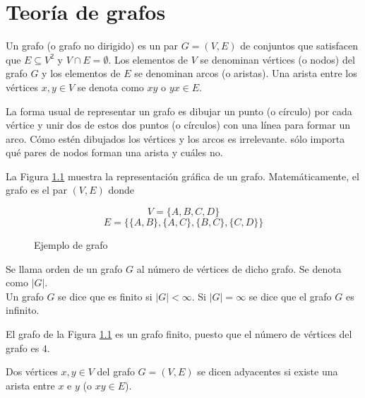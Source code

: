 \chapter{Teoría de grafos} \label{teoria_grafos}

\begin{defi}
Un grafo (o grafo no dirigido) es un par $G = (V,E)$ de conjuntos que satisfacen que $E \subseteq V^2$ y $V \cap E = \emptyset$. Los elementos de $V$ se denominan vértices (o nodos) del grafo $G$ y los elementos de $E$ se denominan arcos (o aristas). Una arista entre los vértices $x, y \in V$ se denota como $xy$ o $yx \in E$.
\end{defi}

La forma usual de representar un grafo es dibujar un punto (o círculo) por cada vértice y unir dos de estos dos puntos (o círculos) con una línea para formar un arco. Cómo estén dibujados los vértices y los arcos es irrelevante. sólo importa qué pares de nodos forman una arista y cuáles no.

\begin{ejemplo}

La Figura \ref{fig:grafo} muestra la representación gráfica de un grafo. Matemáticamente, el grafo es el par $(V, E)$ donde

\[ V = \{A, B, C, D\} \]
\[ E = \{\{A,B\},\{A,C\},\{B,C\},\{C,D\} \} \]

\begin{figure}[htb]
\centering
\ejemplografo
\caption{Ejemplo de grafo}
\label{fig:grafo}
\end{figure}

\end{ejemplo}

\begin{defi}
Se llama orden de un grafo $G$ al número de vértices de dicho grafo. Se denota como $|G|$.\\
Un grafo $G$ se dice que es finito si $|G| < \infty$. Si $|G| = \infty$ se dice que el grafo $G$ es infinito.
\end{defi}

\begin{ejemplo}
El grafo de la Figura \ref{fig:grafo} es un grafo finito, puesto que el número de vértices del grafo es $4$.
\end{ejemplo}

\begin{defi}
Dos vértices $x,y \in V$ del grafo $G = (V,E)$ se dicen adyacentes si existe una arista entre $x$ e $y$ (o $xy \in E$).
\end{defi}

